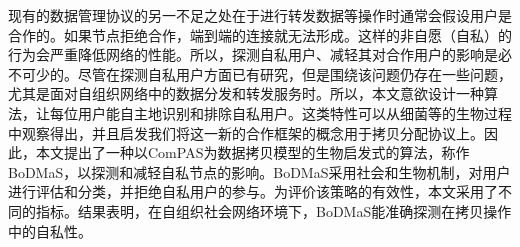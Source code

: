 {现有的数据管理协议的另一不足之处在于进行转发数据等操作时通常会假设用户是合作的。如果节点拒绝合作，端到端的连接就无法形成。这样的非自愿（自私）的行为会严重降低网络的性能。所以，探测自私用户、减轻其对合作用户的影响是必不可少的。尽管在探测自私用户方面已有研究，但是围绕该问题仍存在一些问题，尤其是面对自组织网络中的数据分发和转发服务时。所以，本文意欲设计一种算法，让每位用户能自主地识别和排除自私用户。这类特性可以从细菌等的生物过程中观察得出，并且启发我们将这一新的合作框架的概念用于拷贝分配协议上。因此，本文提出了一种以ComPAS为数据拷贝模型的生物启发式的算法，称作BoDMaS，以探测和减轻自私节点的影响。BoDMaS采用社会和生物机制，对用户进行评估和分类，并拒绝自私用户的参与。为评价该策略的有效性，本文采用了不同的指标。结果表明，在自组织社会网络环境下，BoDMaS能准确探测在拷贝操作中的自私性。
}




\makecover
